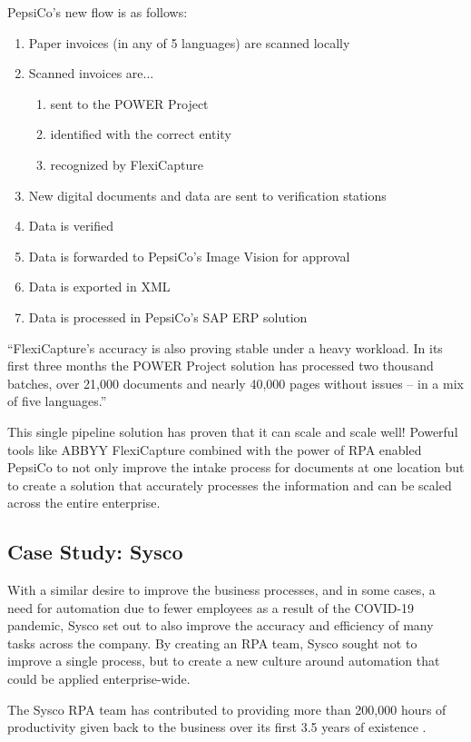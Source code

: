 \documentclass[conference]{IEEEtran}
\begin{document}
PepsiCo's new flow is as follows:
\begin{enumerate}
\item Paper invoices (in any of 5 languages) are scanned locally
\item Scanned invoices are...
    \begin{enumerate}
        \item sent to the POWER Project
        \item identified with the correct entity
        \item recognized by FlexiCapture
    \end{enumerate}
\item New digital documents and data are sent to verification stations
\item Data is verified
\item Data is forwarded to PepsiCo's Image Vision for approval
\item Data is exported in XML
\item Data is processed in PepsiCo's SAP ERP solution
\end{enumerate}

``FlexiCapture's accuracy is also proving stable under a heavy workload. In its first three months the POWER Project solution has processed two thousand batches, over 21,000 documents and nearly 40,000 pages without issues – in a mix of five languages.'' \cite{pepsico}

This single pipeline solution has proven that it can scale and scale well! Powerful tools like ABBYY FlexiCapture combined with the power of RPA enabled PepsiCo to not only improve the intake process for documents at one location but to create a solution that accurately processes the information and can be scaled across the entire enterprise.

\subsection{Case Study: Sysco}
With a similar desire to improve the business processes, and in some cases, a need for automation due to fewer employees as a result of the COVID-19 pandemic, Sysco set out to also improve the accuracy and efficiency of many tasks across the company. By creating an RPA team, Sysco sought not to improve a single process, but to create a new culture around automation that could be applied enterprise-wide.

The Sysco RPA team has contributed to providing more than 200,000 hours of productivity given back to the business over its first 3.5 years of existence \cite{bpcafe2021sysco:slides}.
\end{document}
